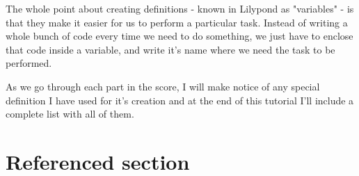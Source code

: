 \documentclass[../../LilyPond-Tutorials]{subfiles}
\begin{document}

The whole point about creating definitions - known in Lilypond as "variables" - is that they make it easier for us to perform a particular task.
Instead of writing a whole bunch of code every time we need to do something, we just have to enclose that code inside a variable, and write it's name where we need the task to be performed.

As we go through each part in the score, I will make notice of any special definition I have used for it's creation and at the end of this tutorial I'll include a complete list with all of them.

\pagebreak

\section{Referenced section}
\label{sec:ref_sec}
\end{document}
